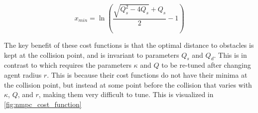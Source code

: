 \begin{equation} \label{eq:x-min}
    x_{min} = \ln \left( \frac{\sqrt{Q_s^2-4Q_s}+Q_s}{2}-1 \right)
\end{equation}

The key benefit of these cost functions is that the optimal distance to obstacles is kept at the collision point, and is invariant to parameters $Q_s$ and $Q_d$. This is in contrast to \autocite{DBLP:journals/corr/KamelASN17} which requires the parameters $\kappa$ and $Q$ to be re-tuned after changing agent radius $r$. This is because their cost functions do not have their minima at the collision point, but instead at some point before the collision that varies with $\kappa$, $Q$, and $r$, making them very difficult to tune. This is visualized in \autoref{fig:nmpc_cost_function}


